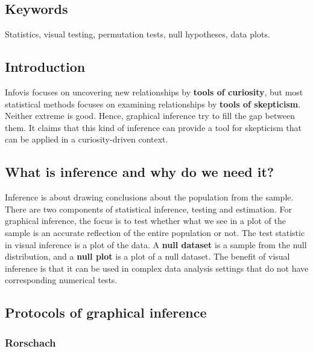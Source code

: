 \documentclass[
]{book}
\begin{document}
\hypertarget{keywords}{%
\subsection{Keywords}\label{keywords}}

Statistics, visual testing, permutation tests, null hypotheses, data plots.

\hypertarget{introduction-1}{%
\subsection{Introduction}\label{introduction-1}}

Infovis focuses on uncovering new relationships by \textbf{tools of curiosity}, but most statistical methods focuses on examining relationships by \textbf{tools of skepticism}. Neither extreme is good. Hence, graphical inference try to fill the gap between them. It claims that this kind of inference can provide a tool for skepticism that can be applied in a curiosity-driven context.

\hypertarget{what-is-inference-and-why-do-we-need-it}{%
\subsection{What is inference and why do we need it?}\label{what-is-inference-and-why-do-we-need-it}}

Inference is about drawing conclusions about the population from the sample. There are two components of statistical inference, testing and estimation. For graphical inference, the focus is to test whether what we see in a plot of the sample is an accurate reflection of the entire population or not. The test statistic in visual inference is a plot of the data. A \textbf{null dataset} is a sample from the null distribution, and a \textbf{null plot} is a plot of a null dataset. The benefit of visual inference is that it can be used in complex data analysis settings that do not have corresponding numerical tests.

\hypertarget{protocols-of-graphical-inference}{%
\subsection{Protocols of graphical inference}\label{protocols-of-graphical-inference}}

\hypertarget{rorschach}{%
\subsubsection{Rorschach}\label{rorschach}}
\end{document}
